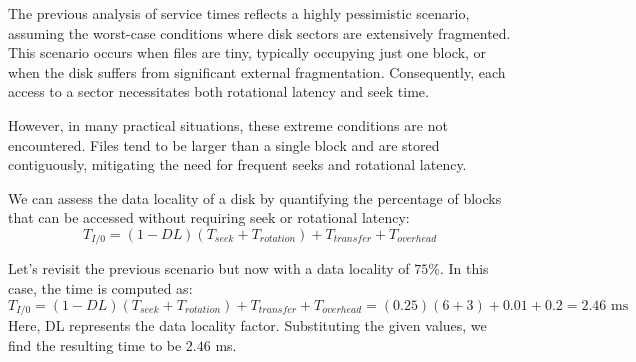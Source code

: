 The previous analysis of service times reflects a highly pessimistic scenario, assuming the worst-case conditions where disk sectors are extensively fragmented. 
This scenario occurs when files are tiny, typically occupying just one block, or when the disk suffers from significant external fragmentation. 
Consequently, each access to a sector necessitates both rotational latency and seek time.

However, in many practical situations, these extreme conditions are not encountered. 
Files tend to be larger than a single block and are stored contiguously, mitigating the need for frequent seeks and rotational latency.

We can assess the data locality of a disk by quantifying the percentage of blocks that can be accessed without requiring seek or rotational latency: 
\[T_{I/0}=(1-DL)(T_{seek}+T_{rotation})+T_{transfer}+T_{overhead}\]
\begin{example}
    Let's revisit the previous scenario but now with a data locality of $75\%$. 
    In this case, the time is computed as:
    \[T_{I/0}=(1-DL)(T_{seek}+T_{rotation})+T_{transfer}+T_{overhead}=(0.25)(6+3)+0.01+0.2=2.46\text{ ms}\]
    Here, DL represents the data locality factor. 
    Substituting the given values, we find the resulting time to be $2.46$ ms.
\end{example}

